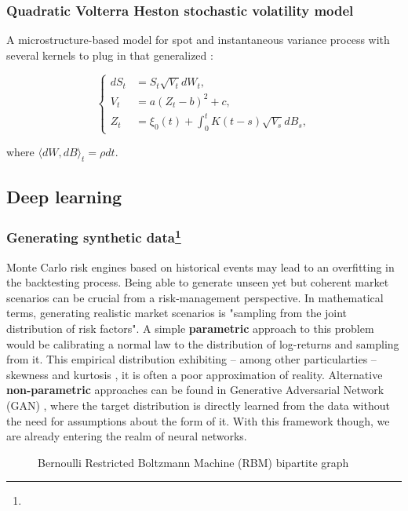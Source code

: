 \subsubsection*{Quadratic Volterra Heston stochastic volatility model}

A microstructure-based model for spot and instantaneous variance process with several kernels to plug in that generalized \cite{gatheral2020quadratic}:

\begin{equation*}\label{eqn:qheston}
\left\{
  \begin{aligned}
    dS_t &= S_t \sqrt{V_t} dW_t,\\
    V_t &= a(Z_t - b)^2 + c,\\
    Z_t &= \xi_0(t) + \int_0^{t} K(t-s) \sqrt{V_s} dB_s,
  \end{aligned}
\right.
\end{equation*}

where $\langle dW, dB \rangle_t = \rho dt$. 



\subsection{Deep learning}

\subsubsection*{Generating synthetic data\footnote{}}

Monte Carlo risk engines based on historical events may lead to an overfitting in the backtesting process. Being able to generate unseen yet but coherent market scenarios can be crucial from a risk-management perspective.
In mathematical terms, generating realistic market scenarios is "sampling from the joint distribution of risk factors". A simple \textbf{parametric} approach to this problem would be calibrating a normal law to the distribution of log-returns and sampling from it. This empirical distribution exhibiting -- among other particularties -- skewness and kurtosis \cite{cont2001empirical}, it is often a poor approximation of reality.\newline
Alternative \textbf{non-parametric} approaches can be found in Generative Adversarial Network (GAN) \cite{goodfellow2014generative}, where the target distribution is directly learned from the data without the need for assumptions about the form of it. With this framework though, we are already entering the realm of neural networks.


\begin{figure}[H]
    \centering
    
    \caption{Bernoulli Restricted Boltzmann Machine (RBM) bipartite graph}
    \label{fig:rbm}
\end{figure}


